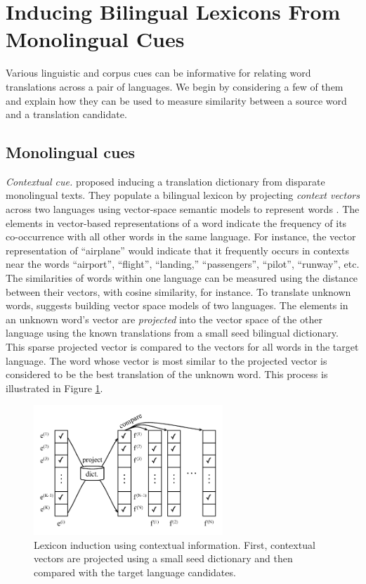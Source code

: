 \documentclass{article}
\newcommand{\mnote}[1]{\marginpar{%
  \vskip-\baselineskip
  \raggedright\footnotesize
  \itshape\hrule\smallskip\tiny{#1}\par\smallskip\hrule}}
\newcommand{\mtodo}[1]{\mnote{\textcolor{red}{#1}}}
\begin{document}
\section{Inducing Bilingual Lexicons From Monolingual Cues}\label{sect:cues}

Various linguistic and corpus cues can be informative for relating word translations across a pair of languages.\mtodo{Little technical details, i.e. no metric defs, etc. Add?}  We begin by considering a few of them and explain how they can be used to measure similarity between a source word and a translation candidate.

\subsection{Monolingual cues}

\noindent\emph{Contextual cue.} \cite{Rapp:1999} proposed inducing a translation dictionary from disparate monolingual texts.  They populate a bilingual lexicon by projecting {\it context vectors} across two languages using vector-space semantic models to represent words  \cite{Deerwester:1990}.  The elements in vector-based representations of a word indicate the frequency of its co-occurrence with all other words in the same language.  For instance, the vector representation of ``airplane'' would indicate that it frequently occurs in contexts near the words ``airport'', ``flight'', ``landing,'' ``passengers'', ``pilot'', ``runway'',  etc.  The similarities of words within one language can be measured using the distance between their vectors, with cosine similarity, for instance.  To translate unknown words, \cite{Rapp:1999} suggests building vector space models of two languages.  The elements in an unknown word's vector are {\it projected} into the vector space of the other language using the known translations from a small seed bilingual dictionary.  This sparse projected vector is compared to the vectors for all words in the target language.  The word whose vector is most similar to the projected vector is considered to be the best translation of the unknown word.  This process is illustrated in Figure \ref{fig:contextual}.\\

\begin{figure}
\centerline{\mbox{\includegraphics[width=2.8in]{figures/contextual}}}
\caption{Lexicon induction using contextual information. First, contextual vectors are projected using a small seed dictionary and then compared with the target language candidates.}
\label{fig:contextual}
\end{figure}
\end{document}
